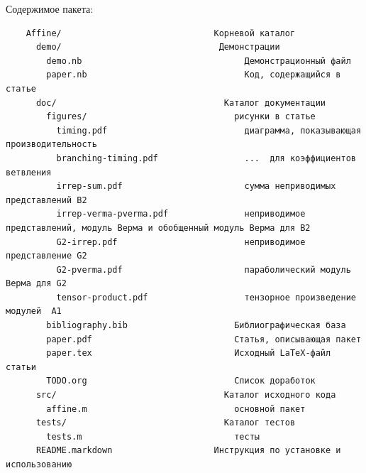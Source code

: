 Содержимое пакета:
\begin{verbatim}
    Affine/                              Корневой каталог
      demo/                               Демонстрации
        demo.nb                                Демонстрационный файл
        paper.nb                               Код, содержащийся в статье 
      doc/                                 Каталог документации
        figures/                             рисунки в статье
          timing.pdf                           диаграмма, показывающая производительность
          branching-timing.pdf                 ...  для коэффициентов ветвления
          irrep-sum.pdf                        сумма неприводимых представлений B2
          irrep-verma-pverma.pdf               неприводимое представлений, модуль Верма и обобщенный модуль Верма для B2
          G2-irrep.pdf                         неприводимое представление G2
          G2-pverma.pdf                        параболический модуль Верма для G2
          tensor-product.pdf                   тензорное произведение модулей  A1
        bibliography.bib                     Библиографическая база
        paper.pdf                            Статья, описывающая пакет
        paper.tex                            Исходный LaTeX-файл статьи
        TODO.org                             Список доработок
      src/                                 Каталог исходного кода
        affine.m                             основной пакет
      tests/                               Каталог тестов
        tests.m                              тесты
      README.markdown                    Инструкция по установке и использованию
\end{verbatim}





